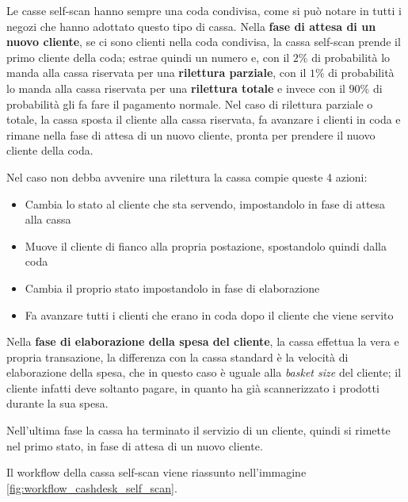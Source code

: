 Le casse self-scan hanno sempre una coda condivisa, come si può notare
in tutti i negozi che hanno adottato questo tipo di cassa. Nella
\textbf{fase di attesa di un nuovo cliente}, se ci sono clienti nella
coda condivisa, la cassa self-scan prende il primo cliente della coda;
estrae quindi un numero e, con il $2 \%$ di probabilità lo manda alla
cassa riservata per una \textbf{rilettura parziale}, con il $1 \%$ di
probabilità lo manda alla cassa riservata per una \textbf{rilettura
  totale} e invece con il $90 \%$ di probabilità gli fa fare il
pagamento normale. Nel caso di rilettura parziale o totale, la cassa
sposta il cliente alla cassa riservata, fa avanzare i clienti in coda
e rimane nella fase di attesa di un nuovo cliente, pronta per prendere
il nuovo cliente della coda.

Nel caso non debba avvenire una rilettura la cassa compie queste 4 azioni:

\begin{itemize}
\item Cambia lo stato al cliente che sta servendo, impostandolo in fase di attesa alla cassa
\item Muove il cliente di fianco alla propria postazione, spostandolo quindi dalla coda
\item Cambia il proprio stato impostandolo in fase di elaborazione
\item Fa avanzare tutti i clienti che erano in coda dopo il cliente che viene servito
\end{itemize}

Nella \textbf{fase di elaborazione della spesa del cliente}, la cassa effettua la vera e propria transazione, la differenza con la cassa standard è la velocità di elaborazione della spesa, che in questo caso è uguale alla \textit{basket size} del cliente; il cliente infatti deve soltanto pagare, in quanto ha già scannerizzato i prodotti durante la sua spesa.

Nell'ultima fase la cassa ha terminato il servizio di un cliente, quindi si rimette nel primo stato, in fase di attesa di un nuovo cliente.

Il workflow della cassa self-scan viene riassunto nell'immagine \ref{fig:workflow_cashdesk_self_scan}.

